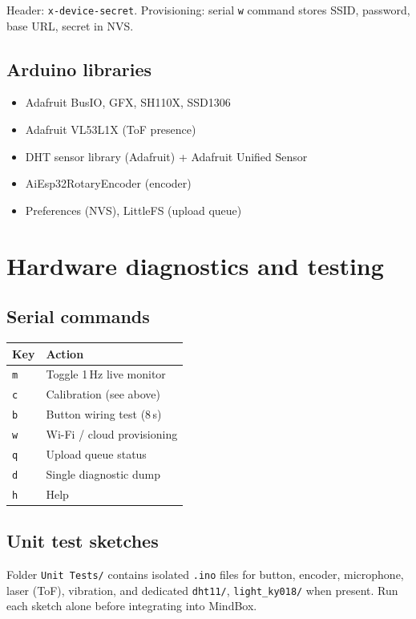 \documentclass[11pt,a4paper]{report}
\newcommand{\filepath}[1]{\texttt{#1}}
\begin{document}
Header: \texttt{x-device-secret}. Provisioning: serial \texttt{w} command stores SSID, password, base URL, secret in NVS.

\section{Arduino libraries}

\begin{itemize}[leftmargin=*]
  \item Adafruit BusIO, GFX, SH110X, SSD1306
  \item Adafruit VL53L1X (ToF presence)
  \item DHT sensor library (Adafruit) + Adafruit Unified Sensor
  \item AiEsp32RotaryEncoder (encoder)
  \item Preferences (NVS), LittleFS (upload queue)
\end{itemize}

\chapter{Hardware diagnostics and testing}

\section{Serial commands}

\begin{tabular}{@{}ll@{}}
\toprule
\textbf{Key} & \textbf{Action} \\
\midrule
\texttt{m} & Toggle 1\,Hz live monitor \\
\texttt{c} & Calibration (see above) \\
\texttt{b} & Button wiring test (8\,s) \\
\texttt{w} & Wi-Fi / cloud provisioning \\
\texttt{q} & Upload queue status \\
\texttt{d} & Single diagnostic dump \\
\texttt{h} & Help \\
\bottomrule
\end{tabular}

\section{Unit test sketches}

Folder \filepath{Unit Tests/} contains isolated \filepath{.ino} files for button, encoder,
microphone, laser (ToF), vibration, and dedicated \filepath{dht11/}, \filepath{light\_ky018/}
when present. Run each sketch alone before integrating into MindBox.
\end{document}
